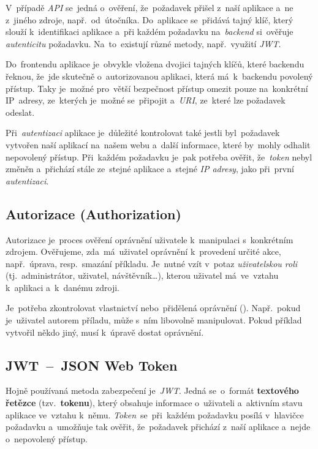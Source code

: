 \documentclass[11pt,a4paper]{report}
\begin{document}
                V~případě \emph{API} se~jedná o~ověření, že~požadavek přišel z~naší aplikace a~ne z~jiného zdroje, např.~od~útočníka. Do~aplikace se~přidává tajný klíč, který slouží k~identifikaci aplikace a~při každém požadavku na~\emph{backend} si~ověřuje \emph{autenticitu} požadavku. Na~to~existují různé metody, např.~využití \emph{JWT}.
                
                Do~frontendu aplikace je~obvykle vložena dvojici tajných klíčů, které backendu řeknou, že~jde skutečně o~autorizovanou aplikaci, která má~k~backendu povolený přístup. Taky je~možné pro~větší bezpečnost přístup omezit pouze na~konkrétní IP~adresy, ze~kterých je~možné se~připojit a~\emph{URI}, ze~které lze požadavek odeslat.

                Při~\emph{autentizaci} aplikace je~důležité kontrolovat také jestli byl~požadavek vytvořen naší aplikací na~našem webu a~další informace, které by~mohly odhalit nepovolený přístup. Při~každém požadavku je~pak potřeba ověřit, že~\emph{token} nebyl změněn a~přichází stále ze~stejné aplikace a~stejné \emph{IP adresy}, jako při~první \emph{autentizaci}. \cite{graham2021ethical}
            
            \subsection{Autorizace (Authorization)}
                Autorizace je~proces ověření oprávnění uživatele k~manipulaci s~konkrétním zdrojem. Ověřujeme, zda~má~uživatel oprávnění k~provedení určité akce, např.~úprava, resp.~smazání příkladu. Je~nutné vzít v~potaz \emph{uživatelskou roli} (tj.~administrátor, uživatel, návštěvník\dots), kterou uživatel má~ve~vztahu k~aplikaci a~k~danému zdroji.
                
                Je~potřeba zkontrolovat vlastnictví nebo~přidělená oprávnění (). Např.~pokud je~uživatel autorem příladu, může s~ním libovolně manipulovat. Pokud příklad vytvořil někdo jiný, musí k~úpravě dostat oprávnění. \cite{graham2021ethical}

            \subsection{JWT~--~JSON Web Token}
                Hojně používaná metoda zabezpečení je~\emph{JWT}. Jedná se~o~formát \textbf{textového řetězce} (tzv.~\textbf{tokenu}), který obsahuje informace o~uživateli a~aktivním stavu aplikace ve~vztahu k~němu. \emph{Token}~se~při~každém požadavku posílá v~hlavičce požadavku a~umožňuje tak ověřit, že~požadavek přichází z~naší aplikace a~nejde o~nepovolený přístup.
                
\end{document}
